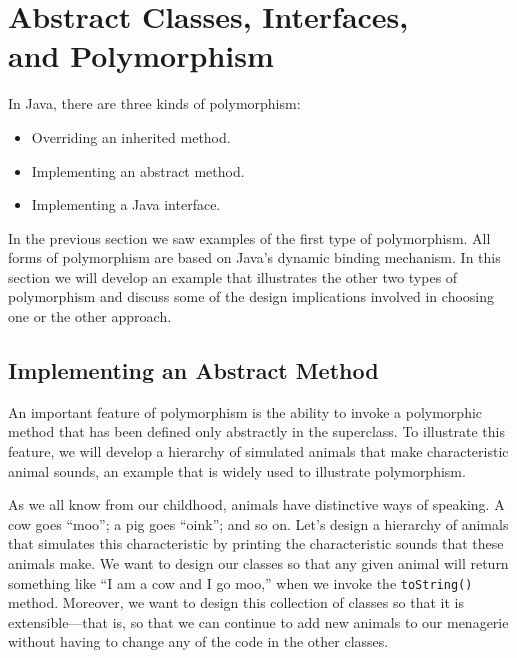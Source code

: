      \section{Abstract Classes, Interfaces, \\ and Polymorphism}
\label{abstract-classes-interfacesand-polymorphism}

In Java, there are three kinds of polymorphism:

\begin{itemize}
\item Overriding an inherited method.
\item Implementing an abstract method.
\item Implementing a Java interface.
\end{itemize}

\noindent In the previous section we saw examples of the first type of
polymorphism.  All forms of polymorphism are based on Java's dynamic
binding mechanism. In this section we will develop an example that
illustrates the other two types of polymorphism and discuss some of
the design implications involved in choosing one or the other
approach.

\subsection{Implementing an Abstract Method}

An important feature of polymorphism is the ability to invoke a
polymorphic method that has been defined only abstractly in the
superclass. To illustrate this feature, we will develop a hierarchy of
simulated animals that make characteristic animal sounds, an example
that is widely used to illustrate polymorphism.

As we all know from our childhood, animals have distinctive ways of
speaking. A cow goes ``moo''; a pig goes ``oink''; and so on.  Let's
design a hierarchy of animals that simulates this characteristic by
printing the characteristic sounds that these animals make.  We want
to design our classes so that any given animal will return something
like ``I am a cow and I go moo,'' when we invoke the {\tt toString()}
method.  Moreover, we want to design this collection of classes so
that it is extensible---that is, so that we can continue to add new
animals to our menagerie without having to change any of the code in
the other classes.


